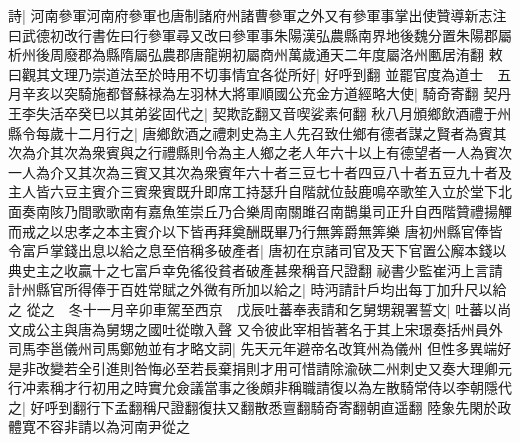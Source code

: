 詩|{
	河南參軍河南府參軍也唐制諸府州諸曹參軍之外又有參軍事掌出使贊導新志注曰武德初改行書佐曰行參軍尋又改曰參軍事朱陽漢弘農縣南界地後魏分置朱陽郡屬析州後周廢郡為縣隋屬弘農郡唐龍朔初屬商州萬歲通天二年度屬洛州匭居洧翻}
敕曰觀其文理乃崇道法至於時用不切事情宜各從所好|{
	好呼到翻}
並罷官度為道士　五月辛亥以突騎施都督蘇禄為左羽林大將軍順國公充金方道經略大使|{
	騎奇寄翻}
契丹王李失活卒癸巳以其弟娑固代之|{
	契欺訖翻又音喫娑素何翻}
秋八月頒鄉飲酒禮于州縣令每歲十二月行之|{
	唐鄉飲酒之禮刺史為主人先召致仕鄉有德者謀之賢者為賓其次為介其次為衆賓與之行禮縣則令為主人鄉之老人年六十以上有德望者一人為賓次一人為介又其次為三賓又其次為衆賓年六十者三豆七十者四豆八十者五豆九十者及主人皆六豆主賓介三賓衆賓既升即席工持瑟升自階就位鼔鹿鳴卒歌笙入立於堂下北面奏南陔乃間歌歌南有嘉魚笙崇丘乃合樂周南關雎召南鵲巢司正升自西階贊禮揚觶而戒之以忠孝之本主賓介以下皆再拜奠酬既畢乃行無筭爵無筭樂}
唐初州縣官俸皆令富戶掌錢出息以給之息至倍稱多破產者|{
	唐初在京諸司官及天下官置公廨本錢以典史主之收贏十之七富戶幸免徭役貧者破產甚衆稱音尺證翻}
祕書少監崔沔上言請計州縣官所得俸于百姓常賦之外微有所加以給之|{
	時沔請計戶均出每丁加升尺以給之}
從之　冬十一月辛卯車駕至西京　戊辰吐蕃奉表請和乞舅甥親署誓文|{
	吐蕃以尚文成公主與唐為舅甥之國吐從暾入聲}
又令彼此宰相皆著名于其上宋璟奏括州員外司馬李邕儀州司馬鄭勉並有才略文詞|{
	先天元年避帝名改箕州為儀州}
但性多異端好是非改變若全引進則咎悔必至若長棄捐則才用可惜請除渝硤二州刺史又奏大理卿元行冲素稱才行初用之時實允僉議當事之後頗非稱職請復以為左散騎常侍以李朝隱代之|{
	好呼到翻行下孟翻稱尺證翻復扶又翻散悉亶翻騎奇寄翻朝直遥翻}
陸象先閑於政體寛不容非請以為河南尹從之

